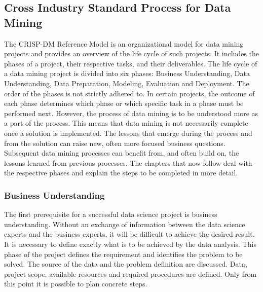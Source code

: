 \subsection{Cross Industry Standard Process for Data Mining}

The CRISP-DM Reference Model is an organizational model for data mining projects and provides
an overview of the life cycle of such projects. 
It includes the phases of a project, their respective tasks, and their deliverables. 
The life cycle of a data mining project is divided into six phases: Business Understanding,
Data Understanding, Data Preparation, Modeling, Evaluation and Deployment. 
The order of the phases is not strictly adhered to. In certain projects,
the outcome of each phase determines which phase or which specific task in a phase must be performed next.
However, the process of data mining is to be understood more as a part of the process.
This means that data mining is not necessarily complete once a solution is implemented. 
The lessons that emerge during the process and from the solution can raise new,
often more focused business questions. 
Subsequent data mining processes can benefit from, and often build on,
the lessons learned from previous processes. 
The chapters that now follow deal with the respective phases and explain the steps
to be completed in more detail.

\subsubsection{Business Understanding}
The first prerequisite for a successful data science project is business understanding. 
Without an exchange of information between the data science experts and the business experts,
it will be difficult to achieve the desired result. 
It is necessary to define exactly what is to be achieved by the data analysis.
This phase of the project defines the requirement and identifies the problem to be solved. 
The source of the data and the problem definition are discussed.
Data, project scope, available resources and required procedures are defined. 
Only from this point it is possible to plan concrete steps.

